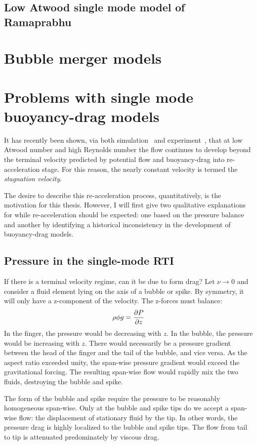 \subsection{Low Atwood single mode model of Ramaprabhu}


\section{Bubble merger models}

\section{Problems with single mode buoyancy-drag models}

It has recently been shown, via both simulation~\cite{Ramaprabhu2006} and experiment~\cite{Wilkinson2007}, that at low Atwood number and high Reynolds number the flow continues to develop beyond the terminal velocity predicted by potential flow and buoyancy-drag into re-acceleration stage.
For this reason, the nearly constant velocity is termed the \textit{stagnation velocity}.

The desire to describe this re-acceleration process, quantitatively, is the motivation for this thesis.
However, I will first give two qualitative explanations for while re-acceleration should be expected: one based on the pressure balance and another by identifying a historical inconsistency in the development of buoyancy-drag models.

\subsection{Pressure in the single-mode RTI}

If there is a terminal velocity regime, can it be due to form drag?
Let $\nu \rightarrow 0$ and consider a fluid element lying on the axis
of a bubble or spike.
By symmetry, it will only have a z-component of the velocity.
The z-forces must balance:
$$ \rho \phi g = \frac{\partial P}{\partial z} $$
In the finger, the pressure would be decreasing with $z$.
In the bubble, the pressure would be increasing with $z$.
There would necessarily be a pressure gradient between the head of the finger and the tail of the bubble, and vice versa.
As the aspect ratio exceeded unity, the span-wise pressure gradient would exceed the gravitational forcing.
The resulting span-wise flow would rapidly mix the two fluids, destroying the bubble and spike.

The form of the bubble and spike require the pressure to be reasonably homogeneous span-wise.
Only at the bubble and spike tips do we accept a span-wise flow: the displacement of stationary fluid by the tip.
In other words, the pressure drag is highly localized to the bubble and spike tips.
The flow from tail to tip is attenuated predominately by viscous drag.

